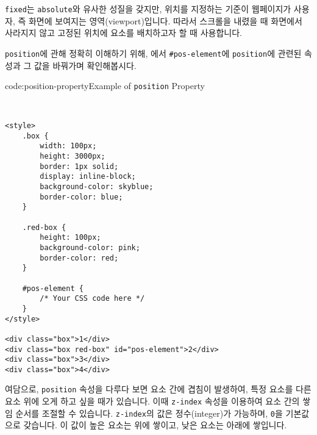 \texttt{fixed}는 \texttt{absolute}와 유사한 성질을 갖지만, 위치를 지정하는 기준이 웹페이지가 사용자, 즉 화면에 보여지는 영역(viewport)입니다. 따라서 스크롤을 내렸을 때 화면에서 사라지지 않고 고정된 위치에 요소를 배치하고자 할 때 사용합니다. 

\texttt{position}에 관해 정확히 이해하기 위해, 에서 \texttt{\#pos-element}에 \texttt{position}에 관련된 속성과 그 값을 바꿔가며 확인해봅시다. 

\begin{codeenv}{code:position-property}{Example of \texttt{position} Property}\begin{verbatim}


<style>
    .box {
        width: 100px;
        height: 3000px;
        border: 1px solid;
        display: inline-block;
        background-color: skyblue;
        border-color: blue;
    }

    .red-box {
        height: 100px;
        background-color: pink;
        border-color: red;
    }

    #pos-element {
        /* Your CSS code here */
    }
</style>

<div class="box">1</div>
<div class="box red-box" id="pos-element">2</div>
<div class="box">3</div>
<div class="box">4</div>
\end{verbatim}
\end{codeenv}

여담으로, \texttt{position} 속성을 다루다 보면 요소 간에 겹침이 발생하여, 특정 요소를 다른 요소 위에 오게 하고 싶을 때가 있습니다. 이때 \texttt{z-index} 속성을 이용하여 요소 간의 쌓임 순서를 조절할 수 있습니다. \texttt{z-index}의 값은 정수(integer)가 가능하며, \texttt{0}을 기본값으로 갖습니다. 이 값이 높은 요소는 위에 쌓이고, 낮은 요소는 아래에 쌓입니다. 
